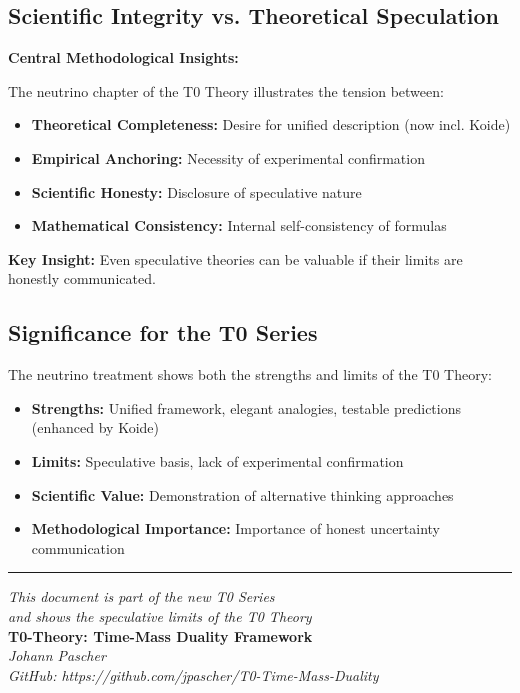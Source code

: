 	\subsection{Scientific Integrity vs. Theoretical Speculation}
	
	\begin{keyresult}
		\textbf{Central Methodological Insights:}
		
		The neutrino chapter of the T0 Theory illustrates the tension between:
		
		\begin{itemize}
			\item \textbf{Theoretical Completeness:} Desire for unified description (now incl. Koide)
			\item \textbf{Empirical Anchoring:} Necessity of experimental confirmation
			\item \textbf{Scientific Honesty:} Disclosure of speculative nature
			\item \textbf{Mathematical Consistency:} Internal self-consistency of formulas
		\end{itemize}
		
		\textbf{Key Insight:} Even speculative theories can be valuable if their limits are honestly communicated.
	\end{keyresult}
	
	\subsection{Significance for the T0 Series}
	
	The neutrino treatment shows both the strengths and limits of the T0 Theory:
	
	\begin{itemize}
		\item \textbf{Strengths:} Unified framework, elegant analogies, testable predictions (enhanced by Koide)
		\item \textbf{Limits:} Speculative basis, lack of experimental confirmation
		\item \textbf{Scientific Value:} Demonstration of alternative thinking approaches
		\item \textbf{Methodological Importance:} Importance of honest uncertainty communication
	\end{itemize}
	
	\begin{center}
		\hrule
		\vspace{0.5cm}
		\textit{This document is part of the new T0 Series}\\
		\textit{and shows the speculative limits of the T0 Theory}\\
		\vspace{0.3cm}
		\textbf{T0-Theory: Time-Mass Duality Framework}\\
		\textit{Johann Pascher}\\
		
		\textit{GitHub: https://github.com/jpascher/T0-Time-Mass-Duality}
		\vspace{0.3cm}
	\end{center}
	
